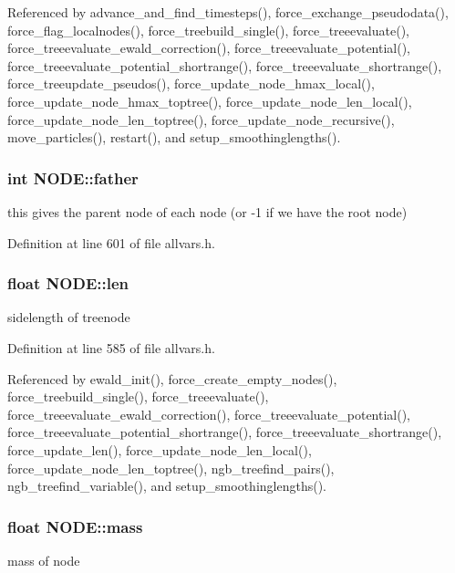 Referenced by advance\_\-and\_\-find\_\-timesteps(), force\_\-exchange\_\-pseudodata(), force\_\-flag\_\-localnodes(), force\_\-treebuild\_\-single(), force\_\-treeevaluate(), force\_\-treeevaluate\_\-ewald\_\-correction(), force\_\-treeevaluate\_\-potential(), force\_\-treeevaluate\_\-potential\_\-shortrange(), force\_\-treeevaluate\_\-shortrange(), force\_\-treeupdate\_\-pseudos(), force\_\-update\_\-node\_\-hmax\_\-local(), force\_\-update\_\-node\_\-hmax\_\-toptree(), force\_\-update\_\-node\_\-len\_\-local(), force\_\-update\_\-node\_\-len\_\-toptree(), force\_\-update\_\-node\_\-recursive(), move\_\-particles(), restart(), and setup\_\-smoothinglengths().

\hypertarget{structNODE_a9a1b7edbe811165e40220f63a38f2d16}{
\subsubsection[{father}]{\setlength{\rightskip}{0pt plus 5cm}int {\bf NODE::father}}}
\label{structNODE_a9a1b7edbe811165e40220f63a38f2d16}
this gives the parent node of each node (or -\/1 if we have the root node) 

Definition at line 601 of file allvars.h.

\hypertarget{structNODE_aae35ad626e2613a4926d4e07fdf9be5c}{
\subsubsection[{len}]{\setlength{\rightskip}{0pt plus 5cm}float {\bf NODE::len}}}
\label{structNODE_aae35ad626e2613a4926d4e07fdf9be5c}
sidelength of treenode 

Definition at line 585 of file allvars.h.



Referenced by ewald\_\-init(), force\_\-create\_\-empty\_\-nodes(), force\_\-treebuild\_\-single(), force\_\-treeevaluate(), force\_\-treeevaluate\_\-ewald\_\-correction(), force\_\-treeevaluate\_\-potential(), force\_\-treeevaluate\_\-potential\_\-shortrange(), force\_\-treeevaluate\_\-shortrange(), force\_\-update\_\-len(), force\_\-update\_\-node\_\-len\_\-local(), force\_\-update\_\-node\_\-len\_\-toptree(), ngb\_\-treefind\_\-pairs(), ngb\_\-treefind\_\-variable(), and setup\_\-smoothinglengths().

\hypertarget{structNODE_adfb345bd40fc1835e54589b46622efda}{
\subsubsection[{mass}]{\setlength{\rightskip}{0pt plus 5cm}float {\bf NODE::mass}}}
\label{structNODE_adfb345bd40fc1835e54589b46622efda}
mass of node 

